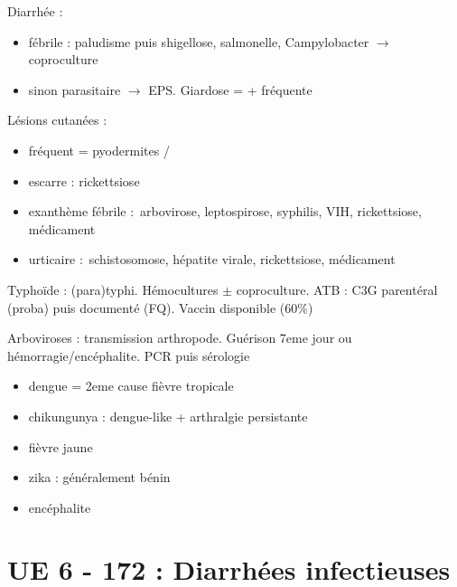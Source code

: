 \documentclass{article}
\begin{document}
Diarrhée :
\begin{itemize}
  \item fébrile : paludisme puis shigellose, salmonelle, Campylobacter
    $\rightarrow$ coproculture
  \item sinon parasitaire $\rightarrow$ EPS. Giardose = + fréquente
\end{itemize}

Lésions cutanées : 
\begin{itemize}
  \item fréquent = pyodermites /
  \item escarre : rickettsiose
  \item exanthème fébrile : arbovirose, leptospirose, syphilis, VIH,
    rickettsiose, médicament
  \item urticaire : schistosomose, hépatite virale, rickettsiose, médicament
\end{itemize} 

Typhoïde :  (para)typhi. Hémocultures $\pm$ coproculture. ATB :
C3G parentéral (proba) puis documenté (FQ). Vaccin disponible (60\%)

\vspace{10pt}
Arboviroses : transmission arthropode. Guérison 7eme jour ou
hémorragie/encéphalite. PCR puis sérologie
\begin{itemize}
  \item dengue = 2eme cause fièvre tropicale
  \item chikungunya : dengue-like + arthralgie persistante
  \item fièvre jaune
  \item zika : généralement bénin
  \item encéphalite
\end{itemize}

\section{UE 6 - 172 : Diarrhées infectieuses}%
\label{sec:ue_6_172_diarrhees_infectieuses}
\end{document}
